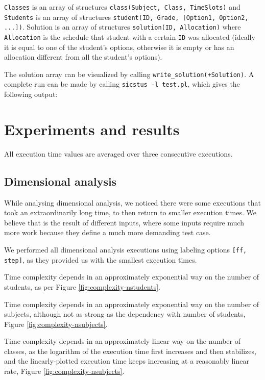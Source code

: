 \documentclass[runningheads]{llncs}
\begin{document}
\texttt{Classes} is an array of structures \texttt{class(Subject, Class, TimeSlots)} and \texttt{Students} is an array of structures \texttt{student(ID, Grade, [Option1, Option2, ...])}. Solution is an array of structures \texttt{solution(ID, Allocation)} where \texttt{Allocation} is the schedule that student with a certain \texttt{ID} was allocated (ideally it is equal to one of the student's options, otherwise it is empty or has an allocation different from all the student's options).

The solution array can be visualized by calling \texttt{write\_solution(+Solution)}. A complete run can be made by calling \texttt{sicstus -l test.pl}, which gives the following output:



\section{Experiments and results}

All execution time values are averaged over three consecutive executions.

\subsection{Dimensional analysis}

While analysing dimensional analysis, we noticed there were some executions that took an extraordinarily long time, to then return to smaller execution times. We believe that is the result of different inputs, where some inputs require much more work because they define a much more demanding test case.

We performed all dimensional analysis executions using labeling options \texttt{[ff, step]}, as they provided us with the smallest execution times.

Time complexity depends in an approximately exponential way on the number of students, as per Figure \ref{fig:complexity-nstudents}.

Time complexity depends in an approximately exponential way on the number of subjects, although not as strong as the dependency with number of students, Figure \ref{fig:complexity-nsubjects}.

Time complexity depends in an approximately linear way on the number of classes, as the logarithm of the execution time first increases and then stabilizes, and the linearly-plotted execution time keeps increasing at a reasonably linear rate, Figure \ref{fig:complexity-nsubjects}.
\end{document}
